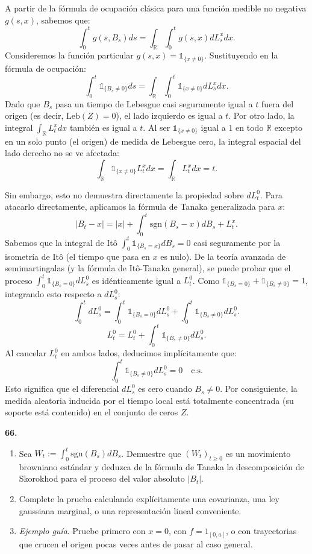 \documentclass[11pt, letterpaper]{article}
\begin{document}
\begin{solucion}
    A partir de la fórmula de ocupación clásica para una función medible no negativa $g(s,x)$, sabemos que:
    \[ \int_0^t g(s, B_s) ds = \int_{\mathbb{R}} \int_0^t g(s, x) dL_s^x dx. \]
    Consideremos la función particular $g(s, x) = \mathbb{1}_{\{x \neq 0\}}$. 
    Sustituyendo en la fórmula de ocupación:
    \[ \int_0^t \mathbb{1}_{\{B_s \neq 0\}} ds = \int_{\mathbb{R}} \int_0^t \mathbb{1}_{\{x \neq 0\}} dL_s^x dx. \]
    Dado que $B_s$ pasa un tiempo de Lebesgue casi seguramente igual a $t$ fuera del origen (es decir, $\text{Leb}(Z) = 0$), el lado izquierdo es igual a $t$.
    Por otro lado, la integral $\int_{\mathbb{R}} L_t^x dx$ también es igual a $t$. 
    Al ser $\mathbb{1}_{\{x \neq 0\}}$ igual a $1$ en todo $\mathbb{R}$ excepto en un solo punto (el origen) de medida de Lebesgue cero, la integral espacial del lado derecho no se ve afectada:
    \[ \int_{\mathbb{R}} \mathbb{1}_{\{x \neq 0\}} L_t^x dx = \int_{\mathbb{R}} L_t^x dx = t. \]
    
    Sin embargo, esto no demuestra directamente la propiedad sobre $dL_t^0$. Para atacarlo directamente, aplicamos la fórmula de Tanaka generalizada para $x$:
    \[ |B_t - x| = |x| + \int_0^t \text{sgn}(B_s - x) dB_s + L_t^x. \]
    Sabemos que la integral de Itô $\int_0^t \mathbb{1}_{\{B_s = x\}} dB_s = 0$ casi seguramente por la isometría de Itô (el tiempo que pasa en $x$ es nulo).
    De la teoría avanzada de semimartingalas (y la fórmula de Itô-Tanaka general), se puede probar que el proceso $\int_0^t \mathbb{1}_{\{B_s = 0\}} dL_s^0$ es idénticamente igual a $L_t^0$.
    Como $\mathbb{1}_{\{B_s = 0\}} + \mathbb{1}_{\{B_s \neq 0\}} = 1$, integrando esto respecto a $dL_s^0$:
    \[ \int_0^t dL_s^0 = \int_0^t \mathbb{1}_{\{B_s = 0\}} dL_s^0 + \int_0^t \mathbb{1}_{\{B_s \neq 0\}} dL_s^0. \]
    \[ L_t^0 = L_t^0 + \int_0^t \mathbb{1}_{\{B_s \neq 0\}} dL_s^0. \]
    Al cancelar $L_t^0$ en ambos lados, deducimos implícitamente que:
    \[ \int_0^t \mathbb{1}_{\{B_s \neq 0\}} dL_s^0 = 0 \quad \text{c.s.} \]
    Esto significa que el diferencial $dL_s^0$ es cero cuando $B_s \neq 0$. Por consiguiente, la medida aleatoria inducida por el tiempo local está totalmente concentrada (su soporte está contenido) en el conjunto de ceros $Z$.
\end{solucion}

\newpage

\begin{ejercicio}
    \textbf{66.} 
    \begin{enumerate}
        \item Sea $W_{t} := \int_{0}^{t}\text{sgn}(B_{s})dB_{s}$. Demuestre que $(W_{t})_{t\ge 0}$ es un movimiento browniano estándar y deduzca de la fórmula de Tanaka la descomposición de Skorokhod para el proceso del valor absoluto $|B_{t}|$.
        \item Complete la prueba calculando explícitamente una covarianza, una ley gaussiana marginal, o una representación lineal conveniente.
        \item \textit{Ejemplo guía}. Pruebe primero con $x=0$, con $f=1_{[0,a]}$, o con trayectorias que crucen el origen pocas veces antes de pasar al caso general.
    \end{enumerate}
\end{ejercicio}
\end{document}
